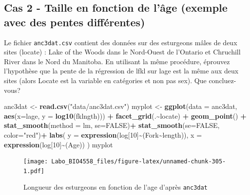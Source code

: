 \documentclass[
  12pt,
]{book}
\makeatletter
\newenvironment{Shaded}{\begin{snugshade}}{\end{snugshade}}
\newcommand{\DataTypeTok}[1]{\textcolor[rgb]{0.13,0.29,0.53}{#1}}
\newcommand{\DecValTok}[1]{\textcolor[rgb]{0.00,0.00,0.81}{#1}}
\newcommand{\KeywordTok}[1]{\textcolor[rgb]{0.13,0.29,0.53}{\textbf{#1}}}
\newcommand{\NormalTok}[1]{#1}
\newcommand{\OperatorTok}[1]{\textcolor[rgb]{0.81,0.36,0.00}{\textbf{#1}}}
\newcommand{\OtherTok}[1]{\textcolor[rgb]{0.56,0.35,0.01}{#1}}
\newcommand{\StringTok}[1]{\textcolor[rgb]{0.31,0.60,0.02}{#1}}
\newenvironment{kframe}{%
\medskip{}
\setlength{\fboxsep}{.8em}
\def\at@end@of@kframe{}%
\ifinner\ifhmode%
 \def\at@end@of@kframe{\end{minipage}}%
 \begin{minipage}{\columnwidth}%
\fi\fi%
\def\FrameCommand##1{\hskip\@totalleftmargin \hskip-\fboxsep
\colorbox{incolor}{##1}\hskip-\fboxsep
    \hskip-\linewidth \hskip-\@totalleftmargin \hskip\columnwidth}%
\MakeFramed {\advance\hsize-\width
  \@totalleftmargin\z@ \linewidth\hsize
  \@setminipage}}%
{\par\unskip\endMakeFramed%
\at@end@of@kframe}
\newenvironment{rmdblock}[1]
 {
 \begin{itemize}
 \renewcommand{\labelitemi}{
   \raisebox{-.7\height}[0pt][0pt]{
     {\setkeys{Gin}{width=3em,keepaspectratio}\texttt{[image: images/\#1]}}
   }
 }
 \begin{kframe}
 \setlength{\fboxsep}{1em}
 \item
 }
 {
 \end{kframe}
 \end{itemize}
 }
\newenvironment{rmdcode}
  {\begin{rmdblock}{screen}}
  {\end{rmdblock}}
\makeatother
\begin{document}
\hypertarget{cas-2---taille-en-fonction-de-luxe2ge-exemple-avec-des-pentes-diffuxe9rentes}{%
\subsection{Cas 2 - Taille en fonction de l'âge (exemple avec des pentes différentes)}\label{cas-2---taille-en-fonction-de-luxe2ge-exemple-avec-des-pentes-diffuxe9rentes}}

\begin{rmdcode}
Le fichier \texttt{anc3dat.csv} contient des données sur des esturgeons mâles de deux sites (locate) : Lake of the Woods dans le Nord-Ouest de l'Ontario et Chruchill River dans le Nord du Manitoba. En utilisant la même procédure, éprouvez l'hypothèse que la pente de la régression de lfkl sur lage est la même aux deux sites (alors Locate est la variable en catégories et non pas sex). Que concluez-vous?
\end{rmdcode}

\begin{Shaded}
\begin{Highlighting}[]
\NormalTok{anc3dat \textless{}{-}}\StringTok{ }\KeywordTok{read.csv}\NormalTok{(}\StringTok{"data/anc3dat.csv"}\NormalTok{)}
\NormalTok{myplot \textless{}{-}}\StringTok{ }\KeywordTok{ggplot}\NormalTok{(}\DataTypeTok{data =}\NormalTok{ anc3dat, }\KeywordTok{aes}\NormalTok{(}\DataTypeTok{x=}\NormalTok{lage, }\DataTypeTok{y =} \KeywordTok{log10}\NormalTok{(fklngth))) }\OperatorTok{+}
\StringTok{  }\KeywordTok{facet\_grid}\NormalTok{(.}\OperatorTok{\textasciitilde{}}\NormalTok{locate) }\OperatorTok{+}
\StringTok{  }\KeywordTok{geom\_point}\NormalTok{() }\OperatorTok{+}
\StringTok{  }\KeywordTok{stat\_smooth}\NormalTok{(}\DataTypeTok{method =}\NormalTok{ lm, }\DataTypeTok{se=}\OtherTok{FALSE}\NormalTok{)}\OperatorTok{+}
\StringTok{  }\KeywordTok{stat\_smooth}\NormalTok{(}\DataTypeTok{se=}\OtherTok{FALSE}\NormalTok{, }\DataTypeTok{color=}\StringTok{"red"}\NormalTok{)}\OperatorTok{+}
\StringTok{  }\KeywordTok{labs}\NormalTok{(}
    \DataTypeTok{y =} \KeywordTok{expression}\NormalTok{(log[}\DecValTok{10}\NormalTok{]}\OperatorTok{\textasciitilde{}}\NormalTok{(Fork}\OperatorTok{\textasciitilde{}}\NormalTok{length)),}
    \DataTypeTok{x =} \KeywordTok{expression}\NormalTok{(log[}\DecValTok{10}\NormalTok{]}\OperatorTok{\textasciitilde{}}\NormalTok{(Age))}
\NormalTok{)}
\NormalTok{myplot}
\end{Highlighting}
\end{Shaded}

\begin{figure}
\centering
\texttt{[image: Labo\_BIO4558\_files/figure-latex/unnamed-chunk-305-1.pdf]}
\caption{\label{fig:unnamed-chunk-305}Longueur des esturgeons en fonction de l'age d'après \texttt{anc3dat}}
\end{figure}
\end{document}
